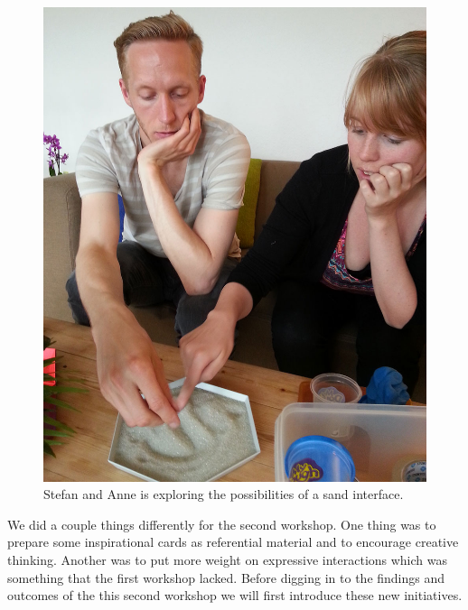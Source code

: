 \begin{figure}[h]
  \centering
  \begin{minipage}[b]{.8\textwidth}
    \centering
    \includegraphics[width=.7\linewidth]{figures/stefan_anne}
  \caption{Stefan and Anne is exploring the possibilities of a sand interface.}
   \label{stefan_anne}
   \end{minipage}
\end{figure}

We did a couple things differently for the second workshop.
One thing was to prepare some inspirational cards as referential material and to encourage creative thinking.
Another was to put more weight on expressive interactions which was something that the first workshop lacked.
Before digging in to the findings and outcomes of the this second workshop we will first introduce these new initiatives.


